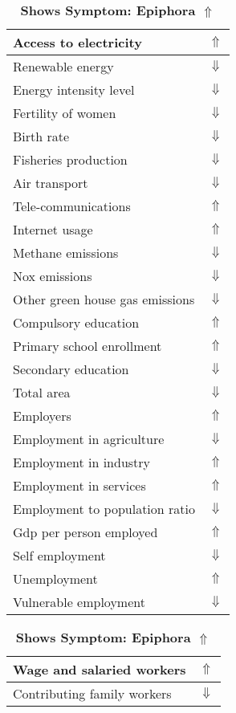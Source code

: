 \documentclass[12pt,notitlepage,oneside]{report}
\begin{document}
\begin{table}[!htb]
\caption{\textbf{Shows Symptom: Epiphora $\Uparrow$}}
\centering
\label{Correlated Socio-economic Factors0}
\begin{tabular}{|l|l|}
\hline
Access to electricity & $\Uparrow$\\ \hline
Renewable energy & $\Downarrow$\\ \hline
Energy intensity level & $\Downarrow$\\ \hline
Fertility of women & $\Downarrow$\\ \hline
Birth rate & $\Downarrow$\\ \hline
Fisheries production & $\Downarrow$\\ \hline
Air transport  & $\Downarrow$\\ \hline
Tele-communications & $\Uparrow$\\ \hline
Internet usage & $\Uparrow$\\ \hline
Methane emissions & $\Downarrow$\\ \hline
Nox emissions & $\Downarrow$\\ \hline
Other green house gas emissions & $\Downarrow$\\ \hline
Compulsory education & $\Uparrow$\\ \hline
Primary school enrollment & $\Uparrow$\\ \hline
Secondary education & $\Downarrow$\\ \hline
Total area & $\Downarrow$\\ \hline
Employers & $\Uparrow$\\ \hline
Employment in agriculture & $\Downarrow$\\ \hline
Employment in industry & $\Uparrow$\\ \hline
Employment in services & $\Uparrow$\\ \hline
Employment to population ratio & $\Downarrow$\\ \hline
Gdp per person employed & $\Uparrow$\\ \hline
Self employment & $\Downarrow$\\ \hline
Unemployment & $\Uparrow$\\ \hline
Vulnerable employment & $\Downarrow$\\ \hline
\end{tabular}
\begin{tabular}{|l|l|}
\hline
Wage and salaried workers & $\Uparrow$\\ \hline
Contributing family workers & $\Downarrow$\\ \hline

\end{tabular}
\end{table}
\end{document}
